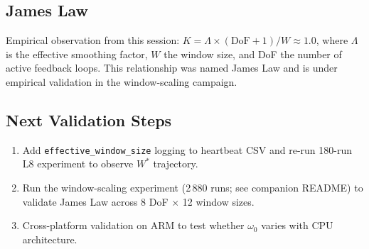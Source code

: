 \subsection{James Law}

Empirical observation from this session: $K = \Lambda \times (\text{DoF}+1)
/ W \approx 1.0$, where $\Lambda$ is the effective smoothing factor,
$W$ the window size, and DoF the number of active feedback loops. This
relationship was named James Law and is under empirical validation in the
window-scaling campaign.


\subsection{Next Validation Steps}

\begin{enumerate}
  \item Add \texttt{effective\_window\_size} logging to heartbeat CSV
        and re-run 180-run L8 experiment to observe $W^*$ trajectory.
  \item Run the window-scaling experiment (2\,880 runs; see companion
        README) to validate James Law across 8 DoF $\times$ 12 window
        sizes.
  \item Cross-platform validation on ARM to test whether $\omega_0$
        varies with CPU architecture.
\end{enumerate}
